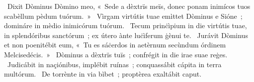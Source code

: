 ~Dixit Dòminus Dòmino meo, «~Sede a dèxtrïs meïs, donec ponam inimícos tuos scabèllum pèdum tuórum.~»
~Vìrgam virtútis tuae emìttet Dòminus e Sióne~; domináre in mèdio inimicórum tuórum. 
~Tecum prinċìpium in die virtútis tuae, in splendóribus sanctórum~; ex útero ànte luċìferum ġènui te. 
~Jurávit Dòminus et non poenitébit eum, «~Tu es sáċerdos in aetèrnum secùndum órdinem Melcisedécis.~»
~Dòminus a dèxtrïs tuïs~; confrégit in die irae suae reġes. 
~Judicábit in naçiónibus, implébit ruínas~; conquassábit cápita in terra multórum. 
~De torrènte in via bìbet~; proptèrea exaltábit caput. 
